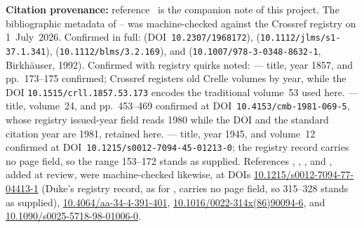 \documentclass[11pt]{article}
\theoremstyle{plain}
\theoremstyle{definition}
\theoremstyle{remark}
\begin{document}
\medskip
\noindent\textbf{Citation provenance:} reference~\cite{CMC} is the
companion note of this project. The bibliographic metadata of
\cite{Kronecker}--\cite{Bertin} was machine-checked against the Crossref
registry on 1~July~2026. Confirmed in full: \cite{Lehmer}
(DOI~\texttt{10.2307/1968172}), \cite{Mahler}
(\texttt{10.1112/jlms/s1-37.1.341}), \cite{Smyth}
(\texttt{10.1112/blms/3.2.169}), and \cite{Bertin}
(\texttt{10.1007/978-3-0348-8632-1}, Birkh\"auser, 1992). Confirmed with
registry quirks noted: \cite{Kronecker} --- title, year 1857, and
pp.~173--175 confirmed; Crossref registers old Crelle volumes by year, while
the DOI \texttt{10.1515/crll.1857.53.173} encodes the traditional volume~53
used here. \cite{Boyd} --- title, volume~24, and pp.~453--469 confirmed at
DOI~\texttt{10.4153/cmb-1981-069-5}, whose registry issued-year field reads
1980 while the DOI and the standard citation year are 1981, retained here.
\cite{Salem} --- title, year 1945, and volume~12 confirmed at
DOI~\texttt{10.1215/s0012-7094-45-01213-0}; the registry record carries no
page field, so the range 153--172 stands as supplied. References
\cite{Boyd1977}, \cite{Dobrowolski}, \cite{Smyth1986}, and
\cite{Mossinghoff}, added at review, were machine-checked likewise, at DOIs
\url{10.1215/s0012-7094-77-04413-1} (Duke's registry record, as for
\cite{Salem}, carries no page field, so 315--328 stands as supplied),
\url{10.4064/aa-34-4-391-401}, \url{10.1016/0022-314x(86)90094-6}, and
\url{10.1090/s0025-5718-98-01006-0}.
\end{document}
